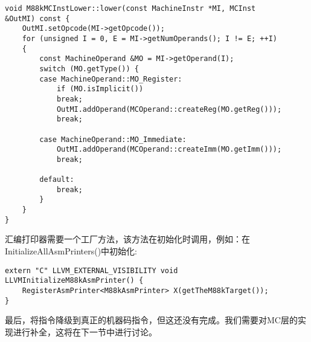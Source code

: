 \begin{lstlisting}[caption={}]
void M88kMCInstLower::lower(const MachineInstr *MI, MCInst
&OutMI) const {
	OutMI.setOpcode(MI->getOpcode());
	for (unsigned I = 0, E = MI->getNumOperands(); I != E; ++I)
	{
		const MachineOperand &MO = MI->getOperand(I);
		switch (MO.getType()) {
		case MachineOperand::MO_Register:
			if (MO.isImplicit())
			break;
			OutMI.addOperand(MCOperand::createReg(MO.getReg()));
			break;
			
		case MachineOperand::MO_Immediate:
			OutMI.addOperand(MCOperand::createImm(MO.getImm()));
			break;
			
		default:
			break;
		}
	}
}
\end{lstlisting}

汇编打印器需要一个工厂方法，该方法在初始化时调用，例如：在InitializeAllAsmPrinters()中初始化:\par

\begin{lstlisting}[caption={}]
extern "C" LLVM_EXTERNAL_VISIBILITY void
LLVMInitializeM88kAsmPrinter() {
	RegisterAsmPrinter<M88kAsmPrinter> X(getTheM88kTarget());
}
\end{lstlisting}

最后，将指令降级到真正的机器码指令，但这还没有完成。我们需要对MC层的实现进行补全，这将在下一节中进行讨论。\par

































